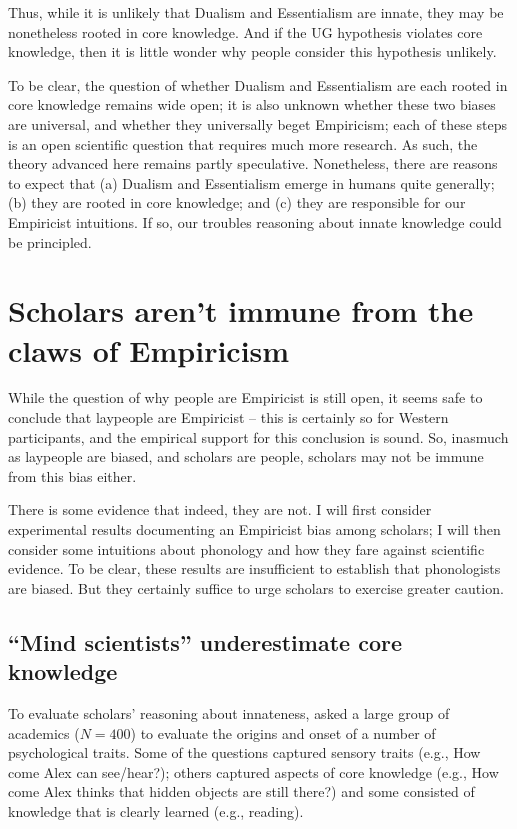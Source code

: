 \documentclass[output=paper,colorlinks,citecolor=brown
]{langscibook}
\begin{document}
Thus, while it is unlikely that Dualism and Essentialism are innate, they may be nonetheless rooted in core knowledge. And if the UG hypothesis violates core knowledge, then it is little wonder why people consider this hypothesis unlikely. 

To be clear, the question of whether Dualism and Essentialism are each rooted in core knowledge remains wide open; it is also unknown whether these two biases are universal, and whether they universally beget Empiricism; each of these steps is an open scientific question that requires much more research. As such, the theory advanced here remains partly speculative. Nonetheless, there are reasons to expect that (a) Dualism and Essentialism emerge in humans quite generally; (b) they are rooted in core knowledge; and (c) they are responsible for our Empiricist intuitions. If so, our troubles reasoning about innate knowledge could be principled.

\section{Scholars aren’t immune from the claws of Empiricism}

While the question of why people are Empiricist is still open, it seems safe to conclude that laypeople are Empiricist -- this is certainly so for Western participants, and the empirical support for this conclusion is sound. So, inasmuch as laypeople are biased, and scholars are people, scholars may not be immune from this bias either. 

There is some evidence that indeed, they are not. I will first consider experimental results documenting an Empiricist bias among scholars; I will then consider some intuitions about phonology and how they fare against scientific evidence. To be clear, these results are insufficient to establish that phonologists are biased. But they certainly suffice to urge scholars to exercise greater caution.

\subsection{“Mind scientists” underestimate core knowledge}
\begin{sloppypar}
To evaluate scholars’ reasoning about innateness, \citet{wang2019empiricism} asked a large group of academics ($N=400$) to evaluate the origins and onset of a number of psychological traits. Some of the questions captured sensory traits (e.g., How come Alex can see/hear?); others captured aspects of core knowledge (e.g., How come Alex thinks that hidden objects are still there?) and some consisted of knowledge that is clearly learned (e.g., reading). 
\end{sloppypar}
\end{document}
